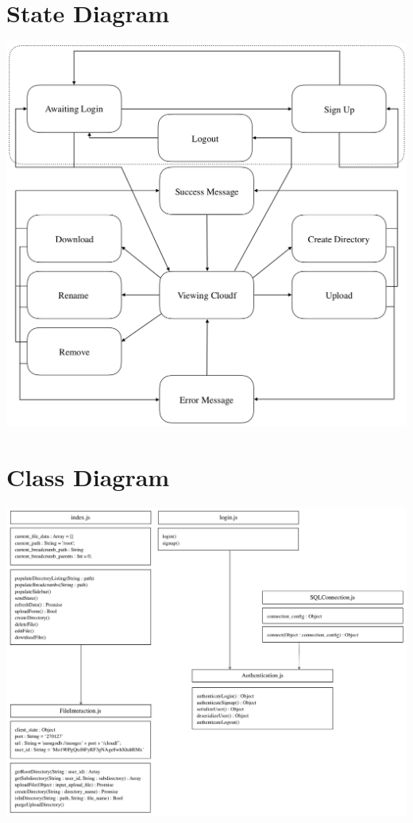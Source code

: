 \documentclass[12pt]{report}
\begin{document}
%
%
\section*{State Diagram}
\begin{center}
    \includegraphics[width=1\textwidth]{images/state_diagram.png}
\end{center}

%
%
\section*{Class Diagram}
\begin{center}
    \includegraphics[width=1\textwidth]{images/class-diagram.png}
\end{center}
\end{document}
